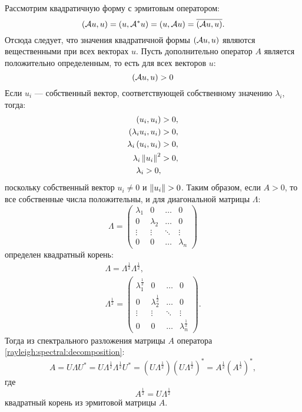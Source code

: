 Рассмотрим квадратичную форму с эрмитовым оператором:
\[
    \left ( \mathcal{A} u, u \right )
    = \left ( u, \mathcal{A}^* u \right )
    = \left ( u, \mathcal{A} u \right )
    = \overline{\left ( \mathcal{A} u, u \right )} .
\]
Отсюда следует, что значения квадратичной формы $\left ( \mathcal{A} u, u \right )$ являются вещественными при всех векторах $u$. Пусть дополнительно оператор $A$
является положительно определенным, то есть для всех векторов $u$:
\[
    \left ( \mathcal{A} u, u \right ) > 0
\]
Если $u_i$ --- собственный вектор, соответствующей собственному значению $\lambda_i$, тогда:
\begin{align*}
    \left ( u_i, u_i \right ) & > 0 , \\
    \left ( \lambda_i u_i, u_i \right ) & > 0 , \\
    \lambda_i \left ( u_i, u_i \right ) & > 0 , \\
    \lambda_i \left \| u_i \right \|^2 & > 0 , \\
    \lambda_i > 0 ,
\end{align*}
поскольку собственный вектор $u_i \neq 0$ и $\left \| u_i \right \| > 0$. Таким образом, если $A > 0$, то все собственные числа положительны, и для диагональной
матрицы $\Lambda$:
\[
    \Lambda
    = \begin{pmatrix}
          \lambda_1 & 0         & \dots  & 0         \\
          0         & \lambda_2 & \dots  & 0         \\
          \vdots    & \vdots    & \ddots & \vdots    \\
          0         & 0         & \dots  & \lambda_n
    \end{pmatrix}
\]
определен квадратный корень:
\begin{gather*}
    \Lambda = \Lambda^{\frac{1}{2}} \Lambda^{\frac{1}{2}} , \\
    \Lambda^\frac{1}{2}
    = \begin{pmatrix}
          \lambda_1^\frac{1}{2} & 0                     & \dots  & 0                     \\
          0                     & \lambda_2^\frac{1}{2} & \dots  & 0                     \\
          \vdots                & \vdots                & \ddots & \vdots                \\
          0                     & 0                     & \dots  & \lambda_n^\frac{1}{2}
    \end{pmatrix}
    .
\end{gather*}
Тогда из спектрального разложения матрицы $A$ оператора \eqref{rayleigh:spectral:decomposition}:
\[
    A
    = U \Lambda U^*
    = U \Lambda^\frac{1}{2} \Lambda^\frac{1}{2} U^*
    = \left ( U \Lambda^\frac{1}{2} \right ) \left ( U \Lambda^\frac{1}{2} \right )^*
    = A^\frac{1}{2} \left ( A^\frac{1}{2} \right )^*,
\]
где
\[
    A^\frac{1}{2} = U \Lambda^\frac{1}{2}
\]
квадратный корень из эрмитовой матрицы $A$.

